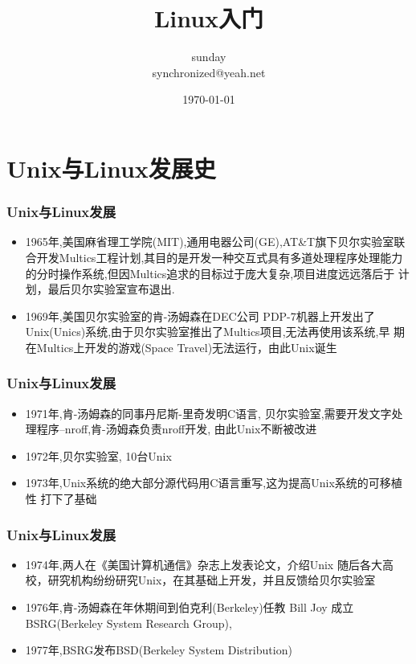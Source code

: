 \documentclass{ctexbeamer}
\title{Linux入门}
\author[sunday]{sunday \\ synchronized@yeah.net}
\date{\today}
\begin{document}
\frame{
\titlepage
}



\section{Unix与Linux发展史}
\begin{frame}
    \frametitle{Unix与Linux发展}
    \begin{itemize}
    \item 1965年,美国麻省理工学院(MIT),通用电器公司(GE),AT&T旗下贝尔实验室联
        合开发Multics工程计划,其目的是开发一种交互式具有多道处理程序处理能力
        的分时操作系统,但因Multics追求的目标过于庞大复杂,项目进度远远落后于
        计划，最后贝尔实验室宣布退出.
    \item 1969年,美国贝尔实验室的肯-汤姆森在DEC公司 PDP-7机器上开发出了
        Unix(Unics)系统,由于贝尔实验室推出了Multics项目,无法再使用该系统,早
        期在Multics上开发的游戏(Space Travel)无法运行，由此Unix诞生
    \end{itemize}
\end{frame}
\begin{frame}
    \frametitle{Unix与Linux发展}
    \begin{itemize}
    \item 1971年,肯-汤姆森的同事丹尼斯-里奇发明C语言,
        贝尔实验室,需要开发文字处理程序--nroff,肯-汤姆森负责nroff开发,
        由此Unix不断被改进
    \item 1972年,贝尔实验室, 10台Unix
    \item 1973年,Unix系统的绝大部分源代码用C语言重写,这为提高Unix系统的可移植性
        打下了基础
    \end{itemize}
\end{frame}
\begin{frame}
    \frametitle{Unix与Linux发展}
    \begin{itemize}
    \item 1974年,两人在《美国计算机通信》杂志上发表论文，介绍Unix
        随后各大高校，研究机构纷纷研究Unix，在其基础上开发，并且反馈给贝尔实验室
    \item 1976年,肯-汤姆森在年休期间到伯克利(Berkeley)任教
        Bill Joy 成立BSRG(Berkeley System Research Group),
    \item 1977年,BSRG发布BSD(Berkeley System Distribution)
    \end{itemize}
\end{frame}
\end{document}
